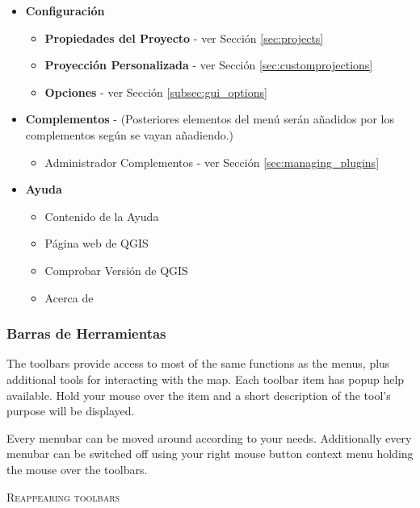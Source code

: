 \begin{itemize}
\item \textbf{Configuración}
\begin{itemize}
\item \textbf{Propiedades del Proyecto}  - ver Sección \ref{sec:projects}
\item \textbf{Proyección Personalizada}   - ver Sección \ref{sec:customprojections}
\item \textbf{Opciones}             - ver Sección \ref{subsec:gui_options}
\end{itemize}

\item \textbf{Complementos} - (Posteriores elementos del menú serán añadidos por los complementos según se vayan añadiendo.)
\begin{itemize}
\item Administrador Complementos          	   - ver Sección \ref{sec:managing_plugins}
\end{itemize}          	

\item \textbf{Ayuda}
\begin{itemize}
\item Contenido de la Ayuda
\item Página web de QGIS
\item Comprobar Versión de QGIS 
\item Acerca de
\end{itemize}

\end{itemize}


\subsubsection{Barras de Herramientas}\label{label_toolbars}

The toolbars provide access to most of the same functions as the menus,
plus additional tools for interacting with the map. Each toolbar item has
popup help available. Hold your mouse over the item and a short description of
the tool's purpose will be displayed. 

Every menubar can be moved around according to your needs. Additionally every
menubar can be switched off using your right mouse button context menu holding
the mouse over the toolbars.

\begin{Tip}
\caption{\textsc{Reappearing toolbars}} 
\end{Tip}

